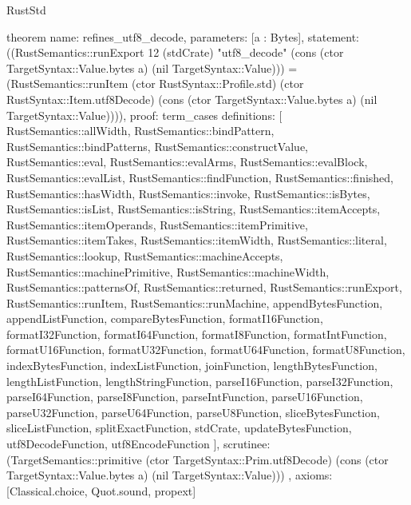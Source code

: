 \begin{lexlean}{RustStd}
\begin{semanticmodule}
theorem{
  name: refines_utf8_decode,
  parameters: [a : Bytes],
  statement: ((RustSemantics::runExport 12 (stdCrate) "utf8_decode" (cons (ctor TargetSyntax::Value.bytes a) (nil TargetSyntax::Value))) = (RustSemantics::runItem (ctor RustSyntax::Profile.std) (ctor RustSyntax::Item.utf8Decode) (cons (ctor TargetSyntax::Value.bytes a) (nil TargetSyntax::Value)))),
  proof: term_cases{
    definitions: [
      RustSemantics::allWidth,
      RustSemantics::bindPattern,
      RustSemantics::bindPatterns,
      RustSemantics::constructValue,
      RustSemantics::eval,
      RustSemantics::evalArms,
      RustSemantics::evalBlock,
      RustSemantics::evalList,
      RustSemantics::findFunction,
      RustSemantics::finished,
      RustSemantics::hasWidth,
      RustSemantics::invoke,
      RustSemantics::isBytes,
      RustSemantics::isList,
      RustSemantics::isString,
      RustSemantics::itemAccepts,
      RustSemantics::itemOperands,
      RustSemantics::itemPrimitive,
      RustSemantics::itemTakes,
      RustSemantics::itemWidth,
      RustSemantics::literal,
      RustSemantics::lookup,
      RustSemantics::machineAccepts,
      RustSemantics::machinePrimitive,
      RustSemantics::machineWidth,
      RustSemantics::patternsOf,
      RustSemantics::returned,
      RustSemantics::runExport,
      RustSemantics::runItem,
      RustSemantics::runMachine,
      appendBytesFunction,
      appendListFunction,
      compareBytesFunction,
      formatI16Function,
      formatI32Function,
      formatI64Function,
      formatI8Function,
      formatIntFunction,
      formatU16Function,
      formatU32Function,
      formatU64Function,
      formatU8Function,
      indexBytesFunction,
      indexListFunction,
      joinFunction,
      lengthBytesFunction,
      lengthListFunction,
      lengthStringFunction,
      parseI16Function,
      parseI32Function,
      parseI64Function,
      parseI8Function,
      parseIntFunction,
      parseU16Function,
      parseU32Function,
      parseU64Function,
      parseU8Function,
      sliceBytesFunction,
      sliceListFunction,
      splitExactFunction,
      stdCrate,
      updateBytesFunction,
      utf8DecodeFunction,
      utf8EncodeFunction
    ],
    scrutinee: (TargetSemantics::primitive (ctor TargetSyntax::Prim.utf8Decode) (cons (ctor TargetSyntax::Value.bytes a) (nil TargetSyntax::Value)))
  },
  axioms: [Classical.choice, Quot.sound, propext]
}


\end{semanticmodule}
\end{lexlean}
